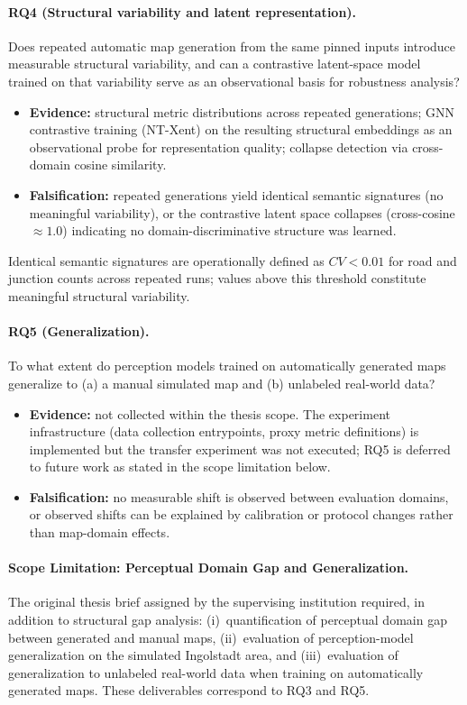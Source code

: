 \paragraph{RQ4 (Structural variability and latent representation).}
Does repeated automatic map generation from the same pinned inputs introduce measurable structural variability, and can a contrastive latent-space model trained on that variability serve as an observational basis for robustness analysis?
\begin{itemize}
  \item \textbf{Evidence:} structural metric distributions across repeated generations; GNN contrastive training (NT-Xent) on the resulting structural embeddings as an observational probe for representation quality; collapse detection via cross-domain cosine similarity.
  \item \textbf{Falsification:} repeated generations yield identical semantic signatures (no meaningful variability), or the contrastive latent space collapses (cross-cosine $\approx 1.0$) indicating no domain-discriminative structure was learned.
\end{itemize}
Identical semantic signatures are operationally defined as $CV < 0.01$ for road and junction counts across repeated runs; values above this threshold constitute meaningful structural variability.

\paragraph{RQ5 (Generalization).}
To what extent do perception models trained on automatically generated maps generalize to (a) a manual simulated map and (b) unlabeled real-world data?
\begin{itemize}
  \item \textbf{Evidence:} not collected within the thesis scope. The experiment infrastructure (data collection entrypoints, proxy metric definitions) is implemented but the transfer experiment was not executed; RQ5 is deferred to future work as stated in the scope limitation below.
  \item \textbf{Falsification:} no measurable shift is observed between evaluation domains, or observed shifts can be explained by calibration or protocol changes rather than map-domain effects.
\end{itemize}


\paragraph{Scope Limitation: Perceptual Domain Gap and Generalization.}
The original thesis brief assigned by the supervising institution required, in addition to structural gap analysis: (i)~quantification of perceptual domain gap between generated and manual maps, (ii)~evaluation of perception-model generalization on the simulated Ingolstadt area, and (iii)~evaluation of generalization to unlabeled real-world data when training on automatically generated maps. These deliverables correspond to RQ3 and RQ5.

